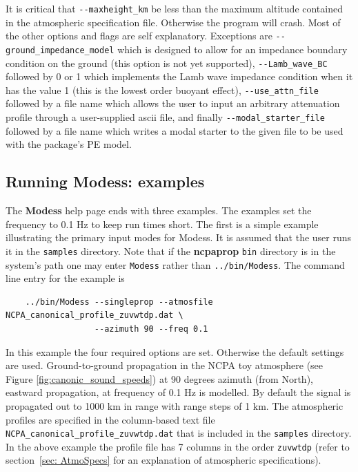 It is critical that \verb+--maxheight_km+ be less than the maximum altitude contained in the atmospheric specification file. Otherwise the program will crash. Most of the other options and flags are self explanatory. Exceptions are \verb+--ground_impedance_model+ which is designed to allow for an impedance boundary condition on the ground (this option is not yet supported), \verb+--Lamb_wave_BC+ followed by 0 or 1 which implements the Lamb wave impedance condition when it has the value 1 (this is the lowest order buoyant effect), \verb+--use_attn_file+ followed by a file name which allows the user to input an arbitrary attenuation profile through a user-supplied ascii file, and finally \verb+--modal_starter_file+ followed by a file name which writes a modal starter to the given file to be used with the package's PE model. 

\subsection{Running Modess: examples}
\label{sec: modess examples}

The \textbf{Modess} help page ends with three examples. The examples set the frequency to 0.1 Hz to keep run times short. The first is a simple example illustrating the primary input modes for Modess. It is assumed that the user runs it in the \verb+samples+ directory. Note that if the \textbf{ncpaprop} \verb+bin+ directory is in the system's path one may enter \verb+Modess+ rather than \verb+../bin/Modess+. The command line entry for the example is 
\begin{verbatim} 
    ../bin/Modess --singleprop --atmosfile NCPA_canonical_profile_zuvwtdp.dat \ 
                  --azimuth 90 --freq 0.1
\end{verbatim}
In this example the four required options are set. Otherwise the default settings are used. Ground-to-ground propagation in the NCPA toy atmosphere (see Figure \ref{fig:canonic_sound_speeds}) at 90 degrees azimuth (from North), eastward propagation, at frequency of 0.1 Hz is modelled. By default the signal is propagated out to 1000 km in range with range steps of 1 km. The atmospheric profiles are specified in the column-based text file \verb"NCPA_canonical_profile_zuvwtdp.dat" that is included in the \verb+samples+ directory. In the above example the profile file has 7 columns in the order \verb"zuvwtdp" (refer to section~\ref{sec: AtmoSpecs}  for an explanation of atmospheric specifications).

